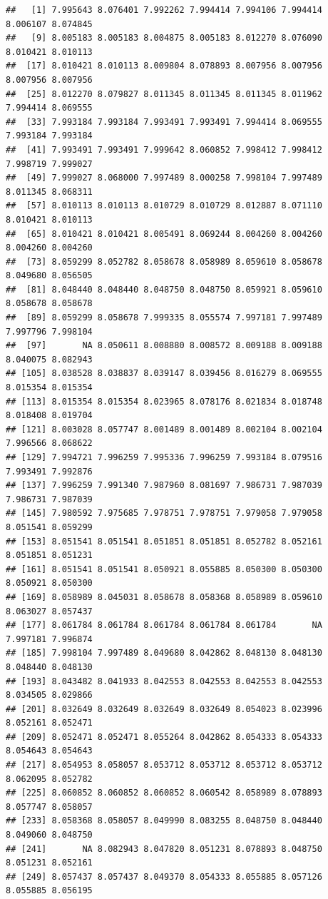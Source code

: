 \documentclass[
]{article}
\begin{document}
\begin{verbatim}
##   [1] 7.995643 8.076401 7.992262 7.994414 7.994106 7.994414 8.006107 8.074845
##   [9] 8.005183 8.005183 8.004875 8.005183 8.012270 8.076090 8.010421 8.010113
##  [17] 8.010421 8.010113 8.009804 8.078893 8.007956 8.007956 8.007956 8.007956
##  [25] 8.012270 8.079827 8.011345 8.011345 8.011345 8.011962 7.994414 8.069555
##  [33] 7.993184 7.993184 7.993491 7.993491 7.994414 8.069555 7.993184 7.993184
##  [41] 7.993491 7.993491 7.999642 8.060852 7.998412 7.998412 7.998719 7.999027
##  [49] 7.999027 8.068000 7.997489 8.000258 7.998104 7.997489 8.011345 8.068311
##  [57] 8.010113 8.010113 8.010729 8.010729 8.012887 8.071110 8.010421 8.010113
##  [65] 8.010421 8.010421 8.005491 8.069244 8.004260 8.004260 8.004260 8.004260
##  [73] 8.059299 8.052782 8.058678 8.058989 8.059610 8.058678 8.049680 8.056505
##  [81] 8.048440 8.048440 8.048750 8.048750 8.059921 8.059610 8.058678 8.058678
##  [89] 8.059299 8.058678 7.999335 8.055574 7.997181 7.997489 7.997796 7.998104
##  [97]       NA 8.050611 8.008880 8.008572 8.009188 8.009188 8.040075 8.082943
## [105] 8.038528 8.038837 8.039147 8.039456 8.016279 8.069555 8.015354 8.015354
## [113] 8.015354 8.015354 8.023965 8.078176 8.021834 8.018748 8.018408 8.019704
## [121] 8.003028 8.057747 8.001489 8.001489 8.002104 8.002104 7.996566 8.068622
## [129] 7.994721 7.996259 7.995336 7.996259 7.993184 8.079516 7.993491 7.992876
## [137] 7.996259 7.991340 7.987960 8.081697 7.986731 7.987039 7.986731 7.987039
## [145] 7.980592 7.975685 7.978751 7.978751 7.979058 7.979058 8.051541 8.059299
## [153] 8.051541 8.051541 8.051851 8.051851 8.052782 8.052161 8.051851 8.051231
## [161] 8.051541 8.051541 8.050921 8.055885 8.050300 8.050300 8.050921 8.050300
## [169] 8.058989 8.045031 8.058678 8.058368 8.058989 8.059610 8.063027 8.057437
## [177] 8.061784 8.061784 8.061784 8.061784 8.061784       NA 7.997181 7.996874
## [185] 7.998104 7.997489 8.049680 8.042862 8.048130 8.048130 8.048440 8.048130
## [193] 8.043482 8.041933 8.042553 8.042553 8.042553 8.042553 8.034505 8.029866
## [201] 8.032649 8.032649 8.032649 8.032649 8.054023 8.023996 8.052161 8.052471
## [209] 8.052471 8.052471 8.055264 8.042862 8.054333 8.054333 8.054643 8.054643
## [217] 8.054953 8.058057 8.053712 8.053712 8.053712 8.053712 8.062095 8.052782
## [225] 8.060852 8.060852 8.060852 8.060542 8.058989 8.078893 8.057747 8.058057
## [233] 8.058368 8.058057 8.049990 8.083255 8.048750 8.048440 8.049060 8.048750
## [241]       NA 8.082943 8.047820 8.051231 8.078893 8.048750 8.051231 8.052161
## [249] 8.057437 8.057437 8.049370 8.054333 8.055885 8.057126 8.055885 8.056195

\end{verbatim}
\end{document}
